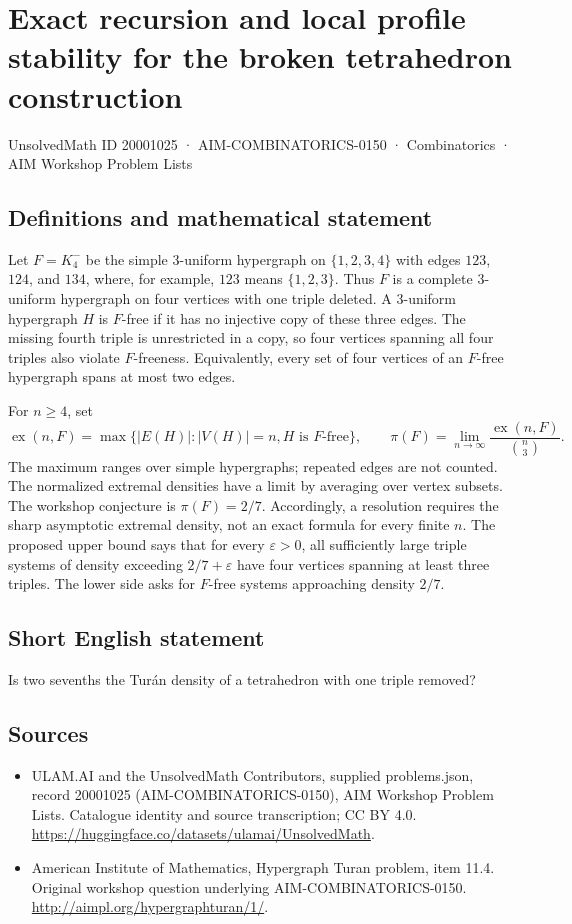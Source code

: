 \documentclass[11pt,a4paper]{article}
\begin{document}
\section*{Exact recursion and local profile stability for the broken tetrahedron construction}\label{20001025}
{\small UnsolvedMath ID 20001025 · AIM-COMBINATORICS-0150 · Combinatorics · AIM Workshop Problem Lists}
\subsection{Definitions and mathematical statement}
Let $F=K_4^-$ be the simple $3$-uniform hypergraph on $\{1,2,3,4\}$
with edges $123$, $124$, and $134$, where, for example, $123$ means
$\{1,2,3\}$. Thus $F$ is a complete $3$-uniform hypergraph on four
vertices with one triple deleted.
A $3$-uniform hypergraph $H$ is $F$-free if it has no injective copy
of these three edges. The missing fourth triple is unrestricted in
a copy, so four vertices spanning all four triples also violate
$F$-freeness. Equivalently, every set of four vertices of an $F$-free
hypergraph spans at most two edges.

For $n\ge4$, set
\[
 \operatorname{ex}(n,F)=\max\{|E(H)|:|V(H)|=n, H\text{ is }F\text{-free}\},
 \qquad
 \pi(F)=\lim_{n\to\infty}\frac{\operatorname{ex}(n,F)}{\binom n3}.
\]
The maximum ranges over simple hypergraphs; repeated edges are not
counted. The normalized extremal densities have a limit by averaging
over vertex subsets.
The workshop conjecture is $\pi(F)=2/7$. Accordingly, a resolution
requires the sharp asymptotic extremal density, not an exact formula
for every finite $n$. The proposed upper bound says that for every
$\varepsilon>0$, all sufficiently large triple systems of density
exceeding $2/7+\varepsilon$ have four vertices spanning at least three
triples. The lower side asks for $F$-free systems approaching density
$2/7$.
\subsection{Short English statement}
Is two sevenths the Turán density of a tetrahedron with one triple removed?
\subsection{Sources}
\begin{itemize}
\item[S1] ULAM.AI and the UnsolvedMath Contributors, supplied problems.json, record 20001025 (AIM-COMBINATORICS-0150), AIM Workshop Problem Lists. Catalogue identity and source transcription; CC BY 4.0.
\url{https://huggingface.co/datasets/ulamai/UnsolvedMath}.
\item[S2] American Institute of Mathematics, Hypergraph Turan problem, item 11.4. Original workshop question underlying AIM-COMBINATORICS-0150.
\url{http://aimpl.org/hypergraphturan/1/}.
\end{itemize}
\end{document}
